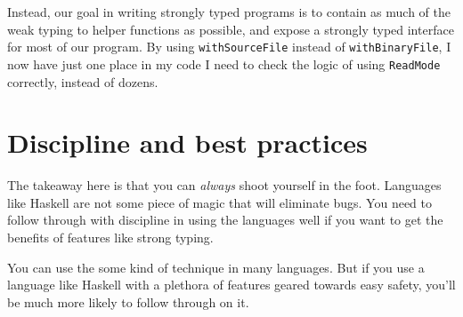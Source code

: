 Instead, our goal in writing strongly typed programs is to contain as much of the weak typing to helper functions as possible, and expose a strongly typed interface for most of our program. By using \texttt{withSourceFile} instead of \texttt{withBinaryFile}, I now have just one place in my code I need to check the logic of using \texttt{ReadMode} correctly, instead of dozens.

\section{Discipline and best practices}

The takeaway here is that you can \textit{always} shoot yourself in the foot. Languages like Haskell are not some piece of magic that will eliminate bugs. You need to follow through with discipline in using the languages well if you want to get the benefits of features like strong typing.

You can use the some kind of technique in many languages. But if you use a language like Haskell with a plethora of features geared towards easy safety, you'll be much more likely to follow through on it.
